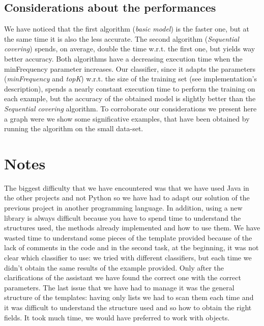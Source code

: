 \documentclass[11pt, a4paper]{article}
\begin{document}
	\subsection{Considerations about the performances}
		We have noticed that the first algorithm (\textit{basic model}) is the faster one, but at the same time it is also the less accurate. The second algorithm (\textit{Sequential covering}) spends, on average, double the time w.r.t. the first one, but yields way better accuracy. Both algorithms have a decreasing execution time when the minFrequency parameter increases.
		Our classifier, since it adapts the parameters (\textit{minFrequency} and \textit{topK}) w.r.t. the size of the training set (see implementation's description), spends a nearly constant execution time to perform the training on each example, but the accuracy of the obtained model is slightly better than the \textit{Sequential covering} algorithm.
		To corroborate our considerations we present here a graph were we show some significative examples, that have been obtained by running the algorithm on the small data-set.

	
	
	\section{Notes}
	The biggest difficulty that we have encountered was that we have used Java in the other projects and not Python so we have had to adapt our solution of the previous project in another programming language. In addition, using a new library is always difficult because you have to spend time to understand the structures used, the methods already implemented and how to use them. \newline
	We have wasted time to understand some pieces of the template provided because of the lack of comments in the code and in the second task, at the beginning, it was not clear which classifier to use: we tried with different classifiers, but each time we didn't obtain the same results of the example provided. \newline Only after the clarifications of the assistant we have found the correct one with the correct parameters. \newline
	The last issue that we have had to manage it was the general structure of the templates: having only lists we had to scan them each time and it was difficult to understand the structure used and so how to obtain the right fields. It took much time, we would have preferred to work with objects.    
		
\end{document}
